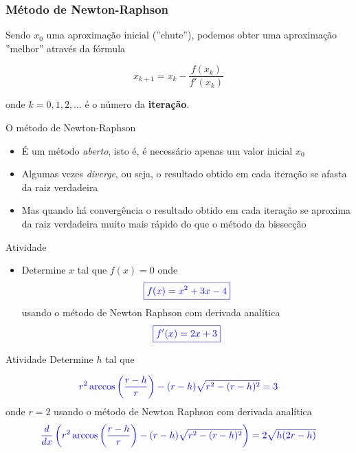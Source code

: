 \begin{frame}
    \frametitle{Método de Newton-Raphson}

    Sendo \(x_0\) uma aproximação inicial (''chute''), podemos obter uma aproximação ''melhor'' através da fórmula
    \begin{block}
        {}
        \[ x_{k+1} = x_k - \frac{f(x_k)}{f'(x_k)} \]
    \end{block}
    onde \(k=0,1,2,\ldots\) é o número da \textbf{iteração}. 

    O método de Newton-Raphson
    \begin{itemize}
        \item É um método \textit{aberto}, isto é, é necessário apenas um valor inicial \(x_0\)
        \item Algumas vezes \textit{diverge}, ou seja, o resultado obtido em cada iteração se afasta da raiz verdadeira
        \item Mas quando há convergência o resultado obtido em cada iteração se aproxima da raiz verdadeira muito mais rápido do que o método da bissecção
    \end{itemize}
\end{frame}

\begin{frame}{Atividade}
    \begin{itemize}
        \item Determine \(x\) tal que \(f(x)=0\) onde
            \[
                \color{blue}
                \boxed{f(x)=x^2+3x-4}
            \]
            usando o método de Newton Raphson com derivada analítica
            \[
                \color{blue}
                \boxed{f'(x)=2x+3}
            \]
    \end{itemize}
\end{frame}

\begin{frame}{Atividade}
    Determine \(h\) tal que

    \[
        \color{blue}
        r^2 \arccos{\left(\frac{r-h}{r}\right)}-(r-h)\sqrt{r^2-(r-h)^2}=3
    \]
    onde \(r=2\) usando o método de Newton Raphson com derivada analítica
    \[
        \color{blue}
        \frac{d}{dx} \left( 
            r^2 \arccos{\left(\frac{r-h}{r}\right)}-(r-h)\sqrt{r^2-(r-h)^2}
        \right)=
        2\sqrt{h(2r-h)}
    \]
\end{frame}

